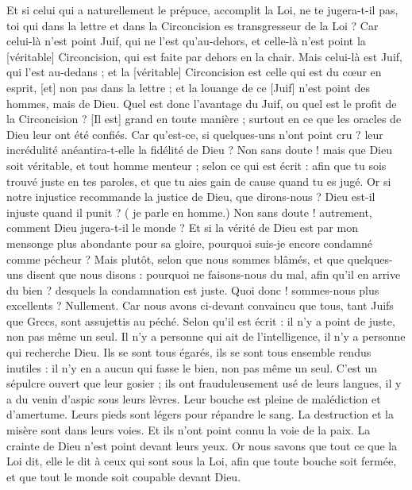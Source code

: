 \begin{multicols}{2}
Et si celui qui a naturellement le prépuce, accomplit la Loi, ne te jugera-t-il pas, toi qui dans la lettre et dans la Circoncision es transgresseur de la Loi ?
Car celui-là n'est point Juif, qui ne l'est qu'au-dehors, et celle-là n'est point la [véritable] Circoncision, qui est faite par dehors en la chair.
Mais celui-là est Juif, qui l'est au-dedans ; et la [véritable] Circoncision est celle qui est du cœur en esprit, [et] non pas dans la lettre ; et la louange de ce [Juif] n'est point des hommes, mais de Dieu.
\VerseOne{}Quel est donc l'avantage du Juif, ou quel est le profit de la Circoncision ?
[Il est] grand en toute manière ; surtout en ce que les oracles de Dieu leur ont été confiés.
Car qu'est-ce, si quelques-uns n'ont point cru ? leur incrédulité anéantira-t-elle la fidélité de Dieu ?
Non sans doute ! mais que Dieu soit véritable, et tout homme menteur ; selon ce qui est écrit : afin que tu sois trouvé juste en tes paroles, et que tu aies gain de cause quand tu es jugé.
Or si notre injustice recommande la justice de Dieu, que dirons-nous ? Dieu est-il injuste quand il punit ? ( je parle en homme.)
Non sans doute ! autrement, comment Dieu jugera-t-il le monde ?
Et si la vérité de Dieu est par mon mensonge plus abondante pour sa gloire, pourquoi suis-je encore condamné comme pécheur ?
Mais plutôt, selon que nous sommes blâmés, et que quelques-uns disent que nous disons : pourquoi ne faisons-nous du mal, afin qu'il en arrive du bien ? desquels la condamnation est juste.
Quoi donc ! sommes-nous plus excellents ? Nullement. Car nous avons ci-devant convaincu que tous, tant Juifs que Grecs, sont assujettis au péché.
Selon qu'il est écrit : il n'y a point de juste, non pas même un seul.
Il n'y a personne qui ait de l'intelligence, il n'y a personne qui recherche Dieu.
Ils se sont tous égarés, ils se sont tous ensemble rendus inutiles : il n'y en a aucun qui fasse le bien, non pas même un seul.
C'est un sépulcre ouvert que leur gosier ; ils ont frauduleusement usé de leurs langues, il y a du venin d'aspic sous leurs lèvres.
Leur bouche est pleine de malédiction et d'amertume.
Leurs pieds sont légers pour répandre le sang.
La destruction et la misère sont dans leurs voies.
Et ils n'ont point connu la voie de la paix.
La crainte de Dieu n'est point devant leurs yeux.
Or nous savons que tout ce que la Loi dit, elle le dit à ceux qui sont sous la Loi, afin que toute bouche soit fermée, et que tout le monde soit coupable devant Dieu.

\end{multicols}
